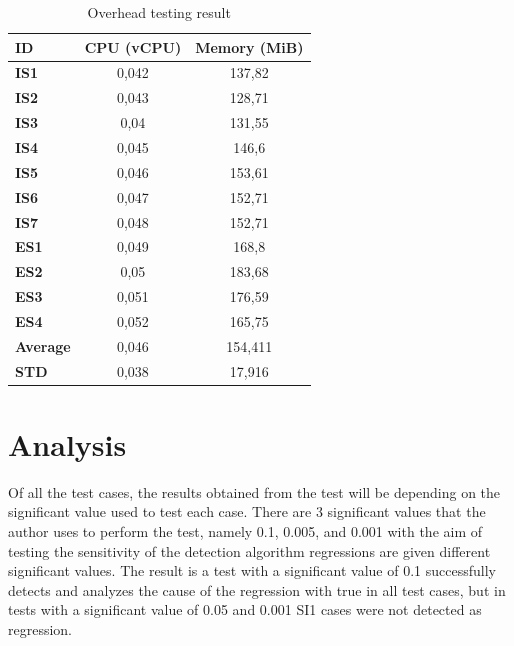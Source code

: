 \documentclass[conference]{configs/IEEEtran}
\begin{document}
\begin{table}[!htb]
	\caption{Overhead testing result}
	\label{overhead-tbl}
	\centering
	\begin{tabular}{|l|c|c|}
		\hline
		\multicolumn{1}{|l|}{ID} & \multicolumn{1}{l|}{CPU (vCPU)} & \multicolumn{1}{l|}{Memory (MiB)} \\ \hline
		\textbf{IS1}     & 0,042 & 137,82  \\ \hline
		\textbf{IS2}     & 0,043 & 128,71  \\ \hline
		\textbf{IS3}     & 0,04  & 131,55  \\ \hline
		\textbf{IS4}     & 0,045 & 146,6   \\ \hline
		\textbf{IS5}     & 0,046 & 153,61  \\ \hline
		\textbf{IS6}     & 0,047 & 152,71  \\ \hline
		\textbf{IS7}     & 0,048 & 152,71  \\ \hline
		\textbf{ES1}     & 0,049 & 168,8   \\ \hline
		\textbf{ES2}     & 0,05  & 183,68  \\ \hline
		\textbf{ES3}     & 0,051 & 176,59  \\ \hline
		\textbf{ES4}     & 0,052 & 165,75  \\ \hline
		\textbf{Average} & 0,046 & 154,411 \\ \hline
		\textbf{STD}     & 0,038 & 17,916  \\ \hline
	\end{tabular}
\end{table}

%
\section{Analysis}
Of all the test cases, the results obtained from the test will be
depending on the significant value used to test each case.
There are 3 significant values that the author uses to perform the test, namely 0.1, 0.005, and 0.001 with the aim of testing the sensitivity of the detection algorithm regressions are given different significant values. The result is a test with
a significant value of 0.1 successfully detects and analyzes the cause of the regression with true in all test cases, but in tests with a significant value of 0.05 and 0.001 SI1 cases were not detected as regression.
\end{document}
